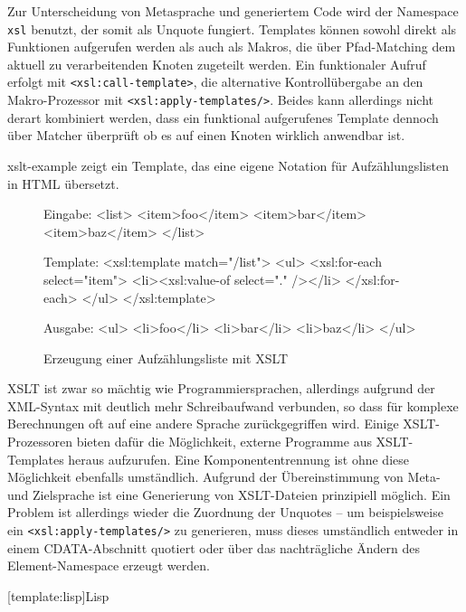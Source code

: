 \documentclass[11pt, a4paper, bibgerm]{scrbook}
\newenvironment{DIFnomarkup}{}{}
\newcommand\icode[1]{\lstinline?#1?}
\newcommand\lsection{}
\newcommand\abb{}
\begin{document}
Zur Unterscheidung von Metasprache und generiertem Code wird der
Namespace \icode{xsl} benutzt, der somit als Unquote fungiert. Templates
können sowohl direkt als Funktionen aufgerufen werden als auch als Makros,
die über Pfad-Matching dem aktuell zu verarbeitenden Knoten zugeteilt
werden. Ein funktionaler Aufruf erfolgt mit \icode{<xsl:call-template>},
die alternative Kontrollübergabe an den Makro-Prozessor mit
\icode{<xsl:apply-templates/>}. Beides kann allerdings nicht derart
kombiniert werden, dass ein funktional aufgerufenes Template dennoch
über Matcher überprüft ob es auf einen Knoten wirklich anwendbar ist.

\abb{xslt-example} zeigt ein Template, das eine eigene Notation für
Aufzählungslisten in HTML übersetzt.
\begin{figure}
  \centering
  \begin{DIFnomarkup}\begin{code}
Eingabe:
<list>
  <item>foo</item>
  <item>bar</item>
  <item>baz</item>
</list>

Template:
<xsl:template match="/list">
  <ul>
    <xsl:for-each select="item">
      <li><xsl:value-of select="." /></li>
    </xsl:for-each>
  </ul>
</xsl:template>    

Ausgabe:
<ul>
  <li>foo</li>
  <li>bar</li>
  <li>baz</li>
</ul>
  \end{code}\end{DIFnomarkup} %
  \caption{Erzeugung einer Aufzählungsliste mit XSLT}
  \label{magicl:fig:xslt-example}
\end{figure}

XSLT ist zwar so mächtig wie Programmiersprachen,
allerdings aufgrund der XML-Syntax mit deutlich mehr Schreibaufwand
verbunden, so dass für komplexe Berechnungen oft auf eine andere Sprache
zurückgegriffen wird. Einige XSLT-Prozessoren bieten dafür die
Möglichkeit, externe Programme aus XSLT-Templates heraus
aufzurufen. Eine Komponententrennung ist ohne diese Möglichkeit
ebenfalls umständlich. Aufgrund der Übereinstimmung von Meta- und
Zielsprache ist eine Generierung von XSLT-Dateien prinzipiell
möglich. Ein Problem ist allerdings wieder die Zuordnung der Unquotes --
um beispielsweise ein \icode{<xsl:apply-templates/>} zu generieren, muss
dieses umständlich entweder in einem CDATA-Abschnitt quotiert oder über
das nachträgliche Ändern des Element-Namespace erzeugt werden.

\lsection[template:lisp]{Lisp}
\end{document}
